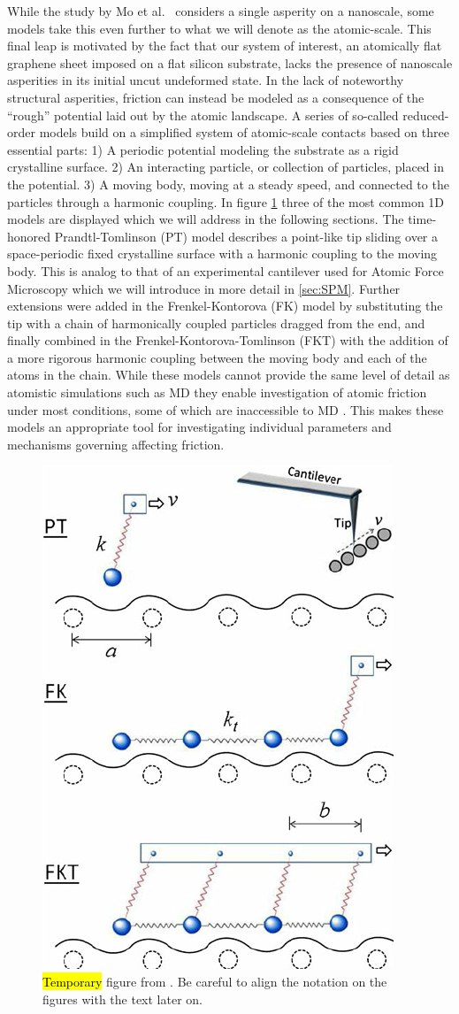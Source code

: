 While the study by Mo et al.\ \cite{mo_friction_2009} considers a single
asperity on a nanoscale, some models take this even further to what we will
denote as the atomic-scale. This final leap is motivated by the fact that our
system of interest, an atomically flat graphene sheet imposed on a flat silicon
substrate, lacks the presence of nanoscale asperities in its initial uncut
undeformed state. In the lack of noteworthy structural asperities, friction can
instead be modeled as a consequence of the ``rough'' potential laid out by
the atomic landscape. A series of so-called reduced-order models build on a
simplified system of atomic-scale contacts based on three essential parts: 1) A
periodic potential modeling the substrate as a rigid crystalline surface. 2) An
interacting particle, or collection of particles, placed in the potential. 3) A
moving body, moving at a steady speed, and connected to the particles through a
harmonic coupling. In figure \cref{fig:PT_FK_FKT} three of the most common 1D
models are displayed which we will address in the following sections. The
time-honored Prandtl-Tomlinson (PT) model describes a point-like tip sliding
over a space-periodic fixed crystalline surface with a harmonic coupling to the
moving body. This is analog to that of an experimental cantilever used for
Atomic Force Microscopy which we will introduce in more detail in
\cref{sec:SPM}. Further extensions were added in the Frenkel-Kontorova
(\acrshort{FK}) model by substituting the tip with a chain of harmonically coupled
particles dragged from the end, and finally combined in the
Frenkel-Kontorova-Tomlinson (\acrshort{FKT}) with the addition of a more
rigorous harmonic coupling between the moving body and each of the atoms in the
chain. While these models cannot provide the same level of detail as atomistic
simulations such as \acrshort{MD} they enable investigation of atomic friction
under most conditions, some of which are inaccessible to \acrshort{MD}
\cite{Yalin_2011}. This makes these models an appropriate tool for investigating
individual parameters and mechanisms governing affecting friction.


\begin{figure}[H]
  \centering
  \includegraphics[width=0.4\linewidth]{figures/theory/PT_FK_FKT.png}
  \caption{\hl{Temporary} figure from \cite{Yalin_2011}. Be careful to align the notation on the figures with the text later on.}
  \label{fig:PT_FK_FKT}
\end{figure}


